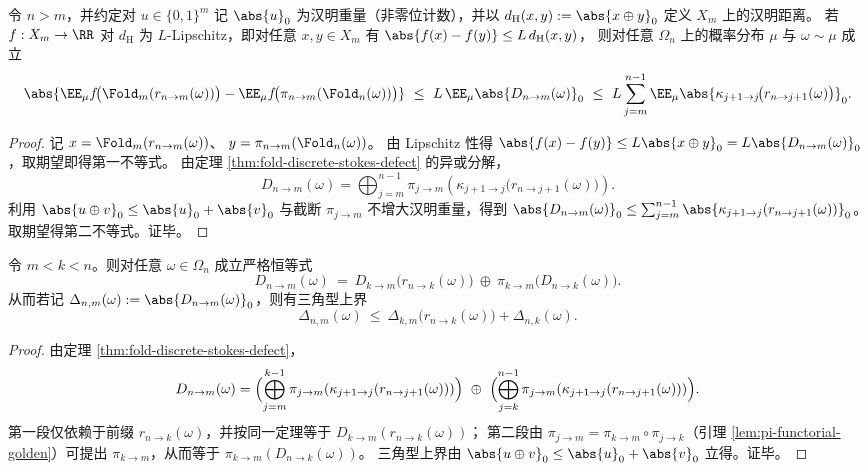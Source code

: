 \begin{corollary}\label{cor:fold-hamming-lipschitz-budget}
令 \(n>m\)，并约定对 \(u\in\{0,1\}^m\) 记 \(\abs{u}_0\) 为汉明重量（非零位计数），并以
\(
d_{\mathrm H}(x,y):=\abs{x\oplus y}_0
\)
定义 \(X_m\) 上的汉明距离。
若 \(f:X_m\to\RR\) 对 \(d_{\mathrm H}\) 为 \(L\)-Lipschitz，即对任意 \(x,y\in X_m\) 有
\(
\abs{f(x)-f(y)}\le L\,d_{\mathrm H}(x,y)
\)，
则对任意 \(\Omega_n\) 上的概率分布 \(\mu\) 与 \(\omega\sim\mu\) 成立
\[
\abs{\EE_\mu f\!\bigl(\Fold_m(r_{n\to m}(\omega))\bigr)-\EE_\mu f\!\bigl(\pi_{n\to m}(\Fold_n(\omega))\bigr)}
\ \le\ L\,\EE_\mu\abs{D_{n\to m}(\omega)}_0
\ \le\ L\sum_{j=m}^{n-1}\EE_\mu\abs{\kappa_{j+1\to j}\!\bigl(r_{n\to j+1}(\omega)\bigr)}_0.
\]
\end{corollary}

\begin{proof}
记
\(
x=\Fold_m(r_{n\to m}(\omega))
\)、
\(
y=\pi_{n\to m}(\Fold_n(\omega))
\)。
由 Lipschitz 性得
\(
\abs{f(x)-f(y)}\le L\abs{x\oplus y}_0=L\abs{D_{n\to m}(\omega)}_0
\)，取期望即得第一不等式。
由定理 \ref{thm:fold-discrete-stokes-defect} 的异或分解，
\[
D_{n\to m}(\omega)=\bigoplus_{j=m}^{n-1}\pi_{j\to m}\!\left(\kappa_{j+1\to j}\!\bigl(r_{n\to j+1}(\omega)\bigr)\right).
\]
利用 \(\abs{u\oplus v}_0\le \abs{u}_0+\abs{v}_0\) 与截断 \(\pi_{j\to m}\) 不增大汉明重量，得到
\(
\abs{D_{n\to m}(\omega)}_0
\le \sum_{j=m}^{n-1}\abs{\kappa_{j+1\to j}(r_{n\to j+1}(\omega))}_0
\)。
取期望得第二不等式。证毕。
\end{proof}

\begin{proposition}[全局缺陷的余因子恒等式与三角型上界]\label{prop:fold-defect-cocycle}
令 \(m<k<n\)。则对任意 \(\omega\in\Omega_n\) 成立严格恒等式
\[
D_{n\to m}(\omega)
\ =\
D_{k\to m}\!\bigl(r_{n\to k}(\omega)\bigr)\ \oplus\ \pi_{k\to m}\!\bigl(D_{n\to k}(\omega)\bigr).
\]
从而若记 \(\Delta_{n,m}(\omega):=\abs{D_{n\to m}(\omega)}_0\)，则有三角型上界
\[
\Delta_{n,m}(\omega)\ \le\ \Delta_{k,m}\!\bigl(r_{n\to k}(\omega)\bigr)+\Delta_{n,k}(\omega).
\]
\end{proposition}

\begin{proof}
由定理 \ref{thm:fold-discrete-stokes-defect}，
\[
D_{n\to m}(\omega)
=\Bigl(\bigoplus_{j=m}^{k-1}\pi_{j\to m}\!\left(\kappa_{j+1\to j}(r_{n\to j+1}(\omega))\right)\Bigr)
\ \oplus\
\Bigl(\bigoplus_{j=k}^{n-1}\pi_{j\to m}\!\left(\kappa_{j+1\to j}(r_{n\to j+1}(\omega))\right)\Bigr).
\]
第一段仅依赖于前缀 \(r_{n\to k}(\omega)\)，并按同一定理等于 \(D_{k\to m}(r_{n\to k}(\omega))\)；
第二段由 \(\pi_{j\to m}=\pi_{k\to m}\circ \pi_{j\to k}\)（引理 \ref{lem:pi-functorial-golden}）可提出 \(\pi_{k\to m}\)，从而等于 \(\pi_{k\to m}(D_{n\to k}(\omega))\)。
三角型上界由 \(\abs{u\oplus v}_0\le \abs{u}_0+\abs{v}_0\) 立得。证毕。
\end{proof}

